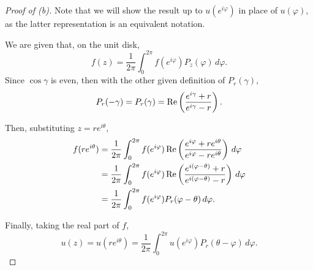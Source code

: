 \documentclass[../hw2]{subfiles}
\begin{document}
\begin{proof}[Proof of (b)]
Note that we will show the result up to $u(e^{i\varphi})$ in place of $u(\varphi)$, as the latter representation is an equivalent notation.

We are given that, on the unit disk, \[
	f(z)=\frac{1}{2\pi}\int_{0}^{2\pi} f(e^{i\varphi}) P_z(\varphi) \,d\varphi
	.\]
Since $\cos{\gamma}$ is even, then with the other given definition of $P_r(\gamma)$,  \[
	P_r(-\gamma)=P_r(\gamma)= \operatorname{Re} \left( \frac{ e^{i\gamma} + r }{e^{i\gamma} - r} \right)
	.\]

Then, substituting $z=re^{i\theta}$,
\begin{align*}
	f(re^{i\theta}) & = \frac{1}{2\pi}\int_{0}^{2\pi} f(e^{i\varphi}) \operatorname{Re} \left( \frac{e^{i\varphi} + re^{i\theta}}{e^{i\varphi} - re^{i\theta}} \right) \,d\varphi \\
	                & = \frac{1}{2\pi}\int_{0}^{2\pi} f(e^{i\varphi}) \operatorname{Re} \left( \frac{e^{i(\varphi-\theta)} + r}{e^{i(\varphi-\theta)}-r} \right) \,d\varphi       \\
	                & =  \frac{1}{2\pi}\int_{0}^{2\pi} f(e^{i\varphi}) P_r(\varphi-\theta) \,d\varphi
	.\end{align*}

Finally, taking the real part of $f$, \[
	u(z)=u(re^{i\theta})=\frac{1}{2\pi}\int_{0}^{2\pi} u(e^{i\varphi}) P_r(\theta-\varphi)\,d \varphi
	.\]
\end{proof}
\end{document}
